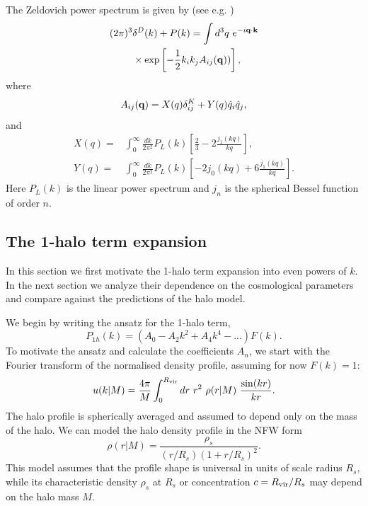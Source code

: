 \documentclass[
  11pt,
  twoside,
  openright,
  titlepage,
  headings=optiontoheadandtoc
]{scrbook}
\begin{document}
The Zeldovich power spectrum is given by (see e.g. \cite{1995MNRAS.273..475S})
\begin{align}
(2\pi)^3&\delta^D (k)+P(k)=\int d^3 q ~e^{-i\mathbf{q}\cdot\mathbf{k}}\nonumber\\
&\times\exp\left[-\frac{1}{2}k_ik_jA_{ij}(\mathbf{q}))\right],
\label{p2:eq:PSwithAW}
\end{align}
where 
\begin{equation}
A_{ij}(\mathbf{q})=X(q)\delta^K_{ij}+Y(q)\hat{q}_i\hat{q}_j,
\end{equation}
and
\begin{align}
  X(q) =& \int_0^\infty \frac{dk}{2\pi^2} P_L(k)
  \left[\frac{2}{3} - 2 \frac{j_1(kq)}{kq}\right] , \\
  Y(q) =& \int_0^\infty \frac{dk}{2\pi^2} P_L(k)
  \left[-2 j_0(kq) + 6 \frac{j_1(kq)}{kq}\right] .
  \label{p2:eq:XYex}
\end{align}
Here $P_L(k)$ is the linear power spectrum and $j_n$ is the spherical Bessel function of order $n$. 

\subsection{The 1-halo term expansion}\label{p2:sec:1haloexpansion}
\label{p2:sec:taylorexpansion}
In this section we first motivate the 1-halo term expansion into even powers of $k$. In the next section we 
analyze their dependence on the cosmological parameters and compare against the predictions of the halo model. 

We begin by writing the ansatz for the 1-halo term, 
\begin{equation}
	P_{1h}(k) = (A_0 - A_2k^2 + A_4k^4- ...)F(k).
	\label{p2:eqn:pk1h_powerlaw}
\end{equation}
To motivate the ansatz and 
calculate the coefficients $A_n$, we start with the Fourier transform of the normalised density profile, assuming 
for now $F(k)=1$:
\begin{equation}
	u(k|M) = \dfrac{4 \pi}{M} \int_0^{R_{\rm vir}}dr\  r^2\  \rho(r|M)\ \dfrac{\sin(kr)}{kr}.
\end{equation}
The halo profile is spherically averaged and
assumed to depend only on the mass of the halo.
We can model the halo density profile in
the NFW form \citep{1997ApJ...490..493N}
\begin{equation}
\rho(r|M)=\frac{\rho_s}{(r/R_s)(1+r/R_s)^2}.
\label{p2:rho}
\end{equation}
This model assumes that the profile shape is
universal in units of scale radius $R_s$, while its characteristic density
$\rho_s$ at $R_s$ or concentration $c=R_{\rm vir}/R_s$ may depend on the halo mass $M$.
\end{document}
